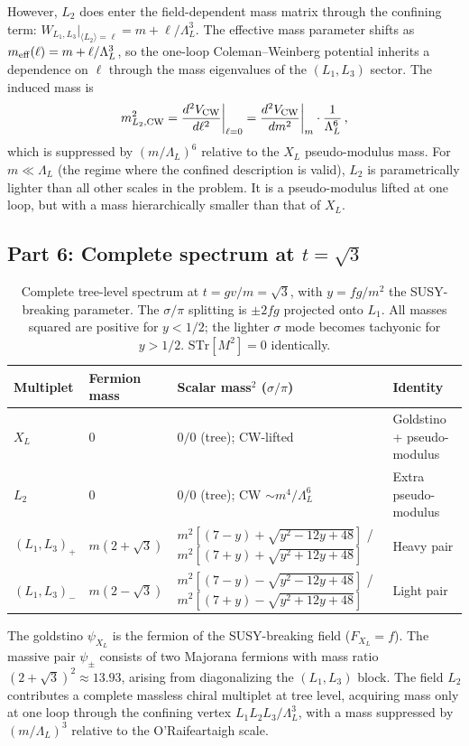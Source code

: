 \documentclass[12pt]{article}
\begin{document}
However, $L_2$ does enter the field-dependent mass matrix through the confining term: $W_{L_1,L_3}\big|_{\langle L_2\rangle = \ell} = m + \ell/\Lambda_L^3$. The effective mass parameter shifts as $m_{\rm eff}(\ell) = m + \ell/\Lambda_L^3$, so the one-loop Coleman--Weinberg potential inherits a dependence on $\ell$ through the mass eigenvalues of the $(L_1,L_3)$ sector. The induced mass is
$$
m^2_{L_2,\rm CW} = \frac{d^2 V_{\rm CW}}{d\ell^2}\bigg|_{\ell=0} = \frac{d^2 V_{\rm CW}}{dm^2}\bigg|_m \cdot \frac{1}{\Lambda_L^6}\,,
$$
which is suppressed by $(m/\Lambda_L)^6$ relative to the $X_L$ pseudo-modulus mass. For $m \ll \Lambda_L$ (the regime where the confined description is valid), $L_2$ is parametrically lighter than all other scales in the problem. It is a pseudo-modulus lifted at one loop, but with a mass hierarchically smaller than that of $X_L$.

\subsection*{Part 6: Complete spectrum at $t=\sqrt{3}$}

\renewcommand{\arraystretch}{1.3}
\begin{table}[h]
\centering
\begin{tabular}{llll}
\toprule
Multiplet & Fermion mass & Scalar mass$^2$ ($\sigma/\pi$) & Identity \\
\midrule
$X_L$ & $0$ & $0/0$ (tree); CW-lifted & Goldstino + pseudo-modulus \\
$L_2$ & $0$ & $0/0$ (tree); CW $\sim m^4/\Lambda_L^6$ & Extra pseudo-modulus \\
$(L_1,L_3)_+$ & $m(2{+}\sqrt{3})$ & $m^2[(7{-}y)+\sqrt{y^2{-}12y{+}48}]$ / $m^2[(7{+}y)+\sqrt{y^2{+}12y{+}48}]$ & Heavy pair \\
$(L_1,L_3)_-$ & $m(2{-}\sqrt{3})$ & $m^2[(7{-}y)-\sqrt{y^2{-}12y{+}48}]$ / $m^2[(7{+}y)-\sqrt{y^2{+}12y{+}48}]$ & Light pair \\
\bottomrule
\end{tabular}
\caption{Complete tree-level spectrum at $t = gv/m = \sqrt{3}$, with $y = fg/m^2$ the SUSY-breaking parameter. The $\sigma/\pi$ splitting is $\pm 2fg$ projected onto $L_1$. All masses squared are positive for $y < 1/2$; the lighter $\sigma$ mode becomes tachyonic for $y > 1/2$. $\mathrm{STr}[M^2]=0$ identically.}
\end{table}

\noindent The goldstino $\psi_{X_L}$ is the fermion of the SUSY-breaking field ($F_{X_L} = f$). The massive pair $\psi_\pm$ consists of two Majorana fermions with mass ratio $(2+\sqrt{3})^2 \approx 13.93$, arising from diagonalizing the $(L_1,L_3)$ block. The field $L_2$ contributes a complete massless chiral multiplet at tree level, acquiring mass only at one loop through the confining vertex $L_1 L_2 L_3/\Lambda_L^3$, with a mass suppressed by $(m/\Lambda_L)^3$ relative to the O'Raifeartaigh scale.
\end{document}
